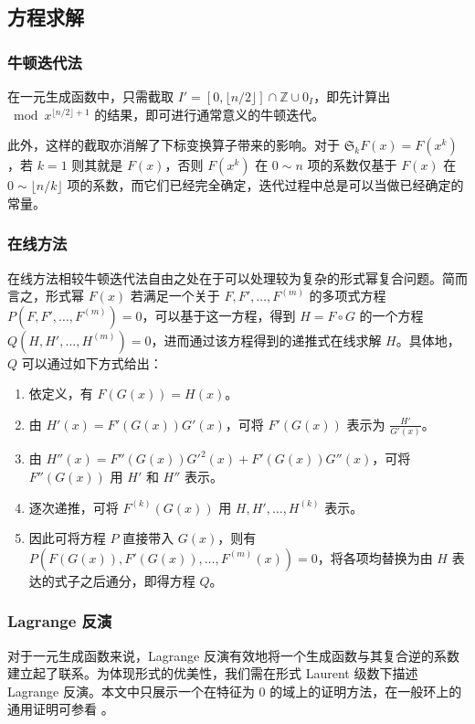 \subsection{方程求解}

\subsubsection{牛顿迭代法}

在一元生成函数中，只需截取 $I' = [0, \lfloor n/2\rfloor] \cap \mathbb Z \cup 0_I$，即先计算出 $\bmod x^{\lfloor n/2\rfloor+1}$ 的结果，即可进行通常意义的牛顿迭代。

此外，这样的截取亦消解了下标变换算子带来的影响。对于 $\mathfrak S_k F(x) = F(x^k)$，若 $k=1$ 则其就是 $F(x)$，否则 $F(x^k)$ 在 $0\sim n$ 项的系数仅基于 $F(x)$ 在 $0 \sim \lfloor n/k\rfloor$ 项的系数，而它们已经完全确定，迭代过程中总是可以当做已经确定的常量。

\subsubsection{在线方法}

在线方法相较牛顿迭代法自由之处在于可以处理较为复杂的形式幂复合问题。简而言之，形式幂 $F(x)$ 若满足一个关于 $F,F',\dots,F^{(m)}$ 的多项式方程 $P(F,F',\dots,F^{(m)})=0$，可以基于这一方程，得到 $H=F\circ G$ 的一个方程 $Q(H,H',\dots,H^{(m)})=0$，进而通过该方程得到的递推式在线求解 $H$。具体地，$Q$ 可以通过如下方式给出：
\begin{enumerate}
\item 依定义，有 $F(G(x)) = H(x)$。
\item 由 $H'(x) = F'(G(x))G'(x)$，可将 $F'(G(x))$ 表示为 $\frac{H'}{G'(x)}$。
\item 由 $H''(x) = F''(G(x))G'^2(x) + F'(G(x))G''(x)$，可将 $F''(G(x))$ 用 $H'$ 和 $H''$ 表示。
\item 逐次递推，可将 $F^{(k)}(G(x))$ 用 $H,H',\dots,H^{(k)}$ 表示。
\item 因此可将方程 $P$ 直接带入 $G(x)$，则有 $P(F(G(x)),F'(G(x)),\dots,F^{(m)}(x)) = 0$，将各项均替换为由 $H$ 表达的式子之后通分，即得方程 $Q$。
\end{enumerate}

\subsubsection{Lagrange 反演}

对于一元生成函数来说，Lagrange 反演有效地将一个生成函数与其复合逆的系数建立起了联系。为体现形式的优美性，我们需在形式 Laurent 级数下描述 Lagrange 反演。本文中只展示一个在特征为 $0$ 的域上的证明方法，在一般环上的通用证明可参看 \cite[Sec. 1.2]{combenum}。

